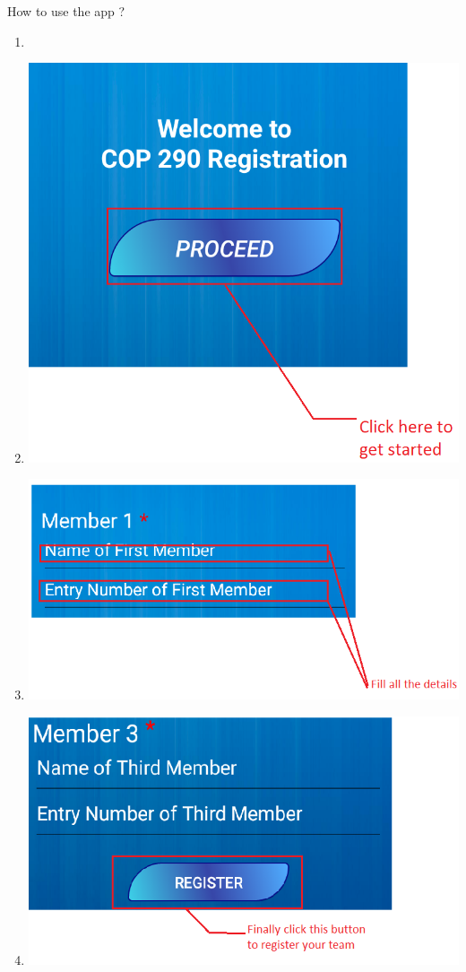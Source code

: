 \documentclass{beamer}
\begin{document}
\begin{frame}{How to use the app ? }
    \begin{enumerate}
        \item  
        \item \includegraphics[scale = 0.153]{img1.png}        
        \item \includegraphics[scale = 0.25]{img2.png}
        \item \includegraphics[scale = 0.225]{img3.png}
    \end{enumerate}
    
    
    
    
\end{frame}
\end{document}
